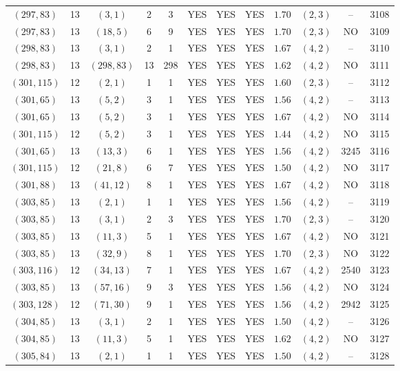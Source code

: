 \begin{longtable}{|c|c|c|c|c|c|c|c|c|c|c|c|}
$(297,83)$ & 13 & $(3,1)$ & 2 & 3 & YES & YES & YES & $1.70$ & $(2,3)$ & -- & 3108\\
$(297,83)$ & 13 & $(18,5)$ & 6 & 9 & YES & YES & YES & $1.70$ & $(2,3)$ & NO & 3109\\
$(298,83)$ & 13 & $(3,1)$ & 2 & 1 & YES & YES & YES & $1.67$ & $(4,2)$ & -- & 3110\\
$(298,83)$ & 13 & $(298,83)$ & 13 & 298 & YES & YES & YES & $1.62$ & $(4,2)$ & NO & 3111\\
$(301,115)$ & 12 & $(2,1)$ & 1 & 1 & YES & YES & YES & $1.60$ & $(2,3)$ & -- & 3112\\
$(301,65)$ & 13 & $(5,2)$ & 3 & 1 & YES & YES & YES & $1.56$ & $(4,2)$ & -- & 3113\\
$(301,65)$ & 13 & $(5,2)$ & 3 & 1 & YES & YES & YES & $1.67$ & $(4,2)$ & NO & 3114\\
$(301,115)$ & 12 & $(5,2)$ & 3 & 1 & YES & YES & YES & $1.44$ & $(4,2)$ & NO & 3115\\
$(301,65)$ & 13 & $(13,3)$ & 6 & 1 & YES & YES & YES & $1.56$ & $(4,2)$ & 3245 & 3116\\
$(301,115)$ & 12 & $(21,8)$ & 6 & 7 & YES & YES & YES & $1.50$ & $(4,2)$ & NO & 3117\\
$(301,88)$ & 13 & $(41,12)$ & 8 & 1 & YES & YES & YES & $1.67$ & $(4,2)$ & NO & 3118\\
$(303,85)$ & 13 & $(2,1)$ & 1 & 1 & YES & YES & YES & $1.56$ & $(4,2)$ & -- & 3119\\
$(303,85)$ & 13 & $(3,1)$ & 2 & 3 & YES & YES & YES & $1.70$ & $(2,3)$ & -- & 3120\\
$(303,85)$ & 13 & $(11,3)$ & 5 & 1 & YES & YES & YES & $1.67$ & $(4,2)$ & NO & 3121\\
$(303,85)$ & 13 & $(32,9)$ & 8 & 1 & YES & YES & YES & $1.70$ & $(2,3)$ & NO & 3122\\
$(303,116)$ & 12 & $(34,13)$ & 7 & 1 & YES & YES & YES & $1.67$ & $(4,2)$ & 2540 & 3123\\
$(303,85)$ & 13 & $(57,16)$ & 9 & 3 & YES & YES & YES & $1.56$ & $(4,2)$ & NO & 3124\\
$(303,128)$ & 12 & $(71,30)$ & 9 & 1 & YES & YES & YES & $1.56$ & $(4,2)$ & 2942 & 3125\\
$(304,85)$ & 13 & $(3,1)$ & 2 & 1 & YES & YES & YES & $1.50$ & $(4,2)$ & -- & 3126\\
$(304,85)$ & 13 & $(11,3)$ & 5 & 1 & YES & YES & YES & $1.62$ & $(4,2)$ & NO & 3127\\
$(305,84)$ & 13 & $(2,1)$ & 1 & 1 & YES & YES & YES & $1.50$ & $(4,2)$ & -- & 3128\\

\end{longtable}
